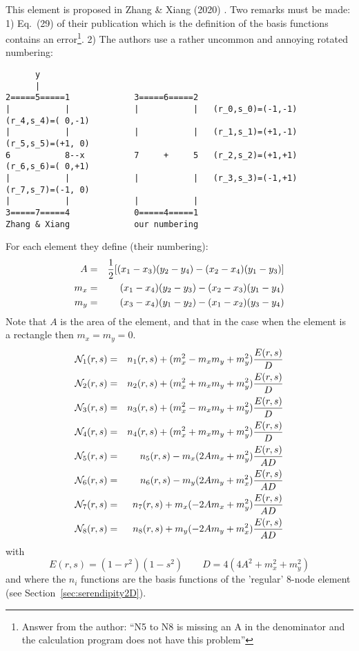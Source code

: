 
This element is proposed in Zhang \& Xiang (2020) \cite{zhxi20}. Two remarks
must be made: 1) Eq.~(29) of their publication which is the definition
of the basis functions contains an error\footnote{
Answer from the author: ``N5 to N8 is missing an A in the denominator and 
the calculation program does not have this problem''}. 
2) The authors use a rather 
uncommon and annoying rotated numbering:
\begin{verbatim}
      y
      |
2=====5=====1             3=====6=====2
|           |             |           |   (r_0,s_0)=(-1,-1)   (r_4,s_4)=( 0,-1)
|           |             |           |   (r_1,s_1)=(+1,-1)   (r_5,s_5)=(+1, 0)
6           8--x          7     +     5   (r_2,s_2)=(+1,+1)   (r_6,s_6)=( 0,+1)
|           |             |           |   (r_3,s_3)=(-1,+1)   (r_7,s_7)=(-1, 0)
|           |             |           |    
3=====7=====4             0=====4=====1
Zhang & Xiang             our numbering
\end{verbatim}

For each element they define (their numbering):
\begin{eqnarray}
A   &=& \frac{1}{2} [ (x_1-x_3)(y_2-y_4)-(x_2-x_4)(y_1-y_3) ] \nonumber\\
m_x &=& (x_1-x_4)(y_2-y_3)-(x_2-x_3)(y_1-y_4) \nonumber\\
m_y &=& (x_3-x_4)(y_1-y_2)-(x_1-x_2)(y_3-y_4) \nonumber
\end{eqnarray}
Note that $A$ is the area of the element, and that in the case when 
the element is a rectangle then $m_x=m_y=0$.
\begin{eqnarray}
{\mathcal{N}}_1(r,s)&=& n_1(r,s) +(m_x^2 - m_xm_y + m_y^2)\frac{E(r,s)}{D} \nonumber\\
{\mathcal{N}}_2(r,s)&=& n_2(r,s) +(m_x^2 + m_xm_y + m_y^2)\frac{E(r,s)}{D} \nonumber\\
{\mathcal{N}}_3(r,s)&=& n_3(r,s) +(m_x^2 - m_xm_y + m_y^2)\frac{E(r,s)}{D} \nonumber\\
{\mathcal{N}}_4(r,s)&=& n_4(r,s) +(m_x^2 + m_xm_y + m_y^2)\frac{E(r,s)}{D} \nonumber\\
{\mathcal{N}}_5(r,s)&=& n_5(r,s) -m_x(2Am_x+m_y^2)\frac{E(r,s)}{AD} \nonumber\\
{\mathcal{N}}_6(r,s)&=& n_6(r,s) -m_y(2Am_y+m_x^2)\frac{E(r,s)}{AD} \nonumber\\
{\mathcal{N}}_7(r,s)&=& n_7(r,s) +m_x(-2Am_x+m_y^2)\frac{E(r,s)}{AD} \nonumber\\
{\mathcal{N}}_8(r,s)&=& n_8(r,s) +m_y(-2Am_y+m_x^2)\frac{E(r,s)}{AD} \nonumber
\end{eqnarray}
with 
\[
E(r,s)=(1-r^2)(1-s^2)
\qquad
D=4(4A^2+m_x^2+m_y^2)
\]
and where the $n_i$ functions are the basis functions of the 'regular' 
8-node element (see Section~\ref{sec:serendipity2D}).

